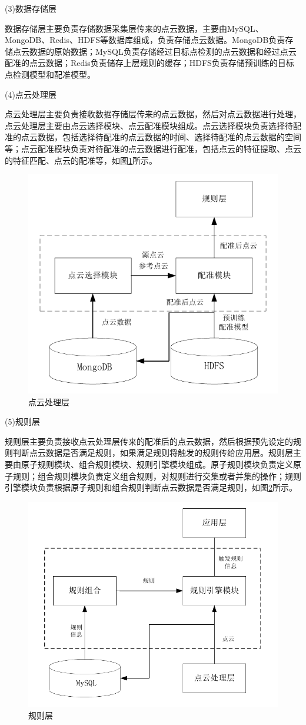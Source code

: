 \par
(3)数据存储层
\par
数据存储层主要负责存储数据采集层传来的点云数据，主要由MySQL、MongoDB、Redis、HDFS等数据库组成，负责存储点云数据。MongoDB负责存储点云数据的原始数据；MySQL负责存储经过目标点检测的点云数据和经过点云配准的点云数据；Redis负责储存上层规则的缓存；HDFS负责存储预训练的目标点检测模型和配准模型。

\par
(4)点云处理层
\par
点云处理层主要负责接收数据存储层传来的点云数据，然后对点云数据进行处理，点云处理层主要由点云选择模块、点云配准模块组成。点云选择模块负责选择待配准的点云数据，包括选择待配准的点云数据的时间、选择待配准的点云数据的空间等；点云配准模块负责对待配准的点云数据进行配准，包括点云的特征提取、点云的特征匹配、点云的配准等，如图\ref{fig:点云处理层}所示。

\begin{figure}[htbp]
    \centering
    \includegraphics[width=0.6\linewidth]{figures/点云处理层.pdf}
    \caption{点云处理层}
    \label{fig:点云处理层}
\end{figure}

\par
(5)规则层
\par
规则层主要负责接收点云处理层传来的配准后的点云数据，然后根据预先设定的规则判断点云数据是否满足规则，如果满足规则将触发的规则传给应用层。规则层主要由原子规则模块、组合规则模块、规则引擎模块组成。原子规则模块负责定义原子规则；组合规则模块负责定义组合规则，对规则进行交集或者并集的操作；规则引擎模块负责根据原子规则和组合规则判断点云数据是否满足规则，如图\ref{fig:规则层}所示。

\begin{figure}[htbp]
    \centering
    \includegraphics[width=0.6\linewidth]{figures/规则层.pdf}
    \caption{规则层}
    \label{fig:规则层}
\end{figure}

